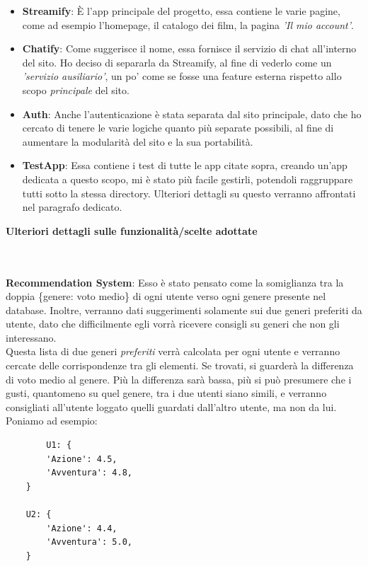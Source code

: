\documentclass[12pt]{article}
\begin{document}
	\begin{itemize}
		\item \textbf{Streamify}: È l'app principale del progetto, essa contiene le varie pagine, come ad esempio l'homepage, il catalogo dei film, la pagina \textit{'Il mio account'}. 
		
		\item \textbf{Chatify}: Come suggerisce il nome, essa fornisce il servizio di chat all'interno del sito. Ho deciso di separarla da Streamify, al fine di vederlo come un \textit{'servizio ausiliario'}, un po' come se fosse una feature esterna rispetto allo scopo \textit{principale} del sito.
		
		\item \textbf{Auth}: Anche l'autenticazione è stata separata dal sito principale, dato che ho cercato di tenere le varie logiche quanto più separate possibili, al fine di aumentare la modularità del sito e la sua portabilità.
		
		\item \textbf{TestApp}: Essa contiene i test di tutte le app citate sopra, creando un'app dedicata a questo scopo, mi è stato più facile gestirli, potendoli raggruppare tutti sotto la stessa directory. Ulteriori dettagli su questo verranno affrontati nel paragrafo dedicato.
	\end{itemize}
	\pagebreak
	
	
	\noindent \centerline {\Huge \textbf{Ulteriori dettagli sulle funzionalità/scelte adottate}} \\ \\
	
	\noindent \textbf{Recommendation System}: Esso è stato pensato come la somiglianza tra la doppia \{genere: voto medio\} di ogni utente verso ogni genere presente nel database.
	Inoltre, verranno dati suggerimenti solamente sui due generi preferiti da utente, dato che difficilmente egli vorrà ricevere consigli su generi che non gli interessano. \\Questa lista di due generi \textit{preferiti} verrà calcolata per ogni utente e verranno cercate delle corrispondenze tra gli elementi. Se trovati, si guarderà la differenza di voto medio al genere. Più la differenza sarà bassa, più si può presumere che i gusti, quantomeno su quel genere, tra i due utenti siano simili, e verranno consigliati all'utente loggato quelli guardati dall'altro utente, ma non da lui. \\
	Poniamo ad esempio:
	\begin{verbatim}
		U1: {
		'Azione': 4.5,
		'Avventura': 4.8,
	}

	U2: {
		'Azione': 4.4,
		'Avventura': 5.0,
	}
	\end{verbatim}
\end{document}
